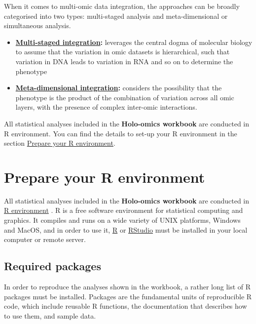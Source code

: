 \documentclass[
]{book}
\begin{document}
When it comes to multi-omic data integration, the approaches can be broadly categorised into two types: multi-staged analysis and meta-dimensional or simultaneous analysis.

\begin{itemize}
\item
  \textbf{\protect\hyperlink{multi-staged-integration}{Multi-staged integration}:} leverages the central dogma of molecular biology to assume that the variation in omic datasets is hierarchical, such that variation in DNA leads to variation in RNA and so on to determine the phenotype
\item
  \textbf{\protect\hyperlink{meta-dimensional-integration}{Meta-dimensional integration}:} considers the possibility that the phenotype is the product of the combination of variation across all omic layers, with the presence of complex inter-omic interactions.
\end{itemize}

All statistical analyses included in the \textbf{Holo-omics workbook} are conducted in R environment. You can find the details to set-up your R environment in the section \protect\hyperlink{prepare-r}{Prepare your R environment}.

\hypertarget{prepare-r}{%
\section{Prepare your R environment}\label{prepare-r}}

All statistical analyses included in the \textbf{Holo-omics workbook} are conducted in \href{https://en.wikipedia.org/wiki/R_(programming_language)}{R environment} \citep{R_Development_Core_Team2008-gd}. R is a free software environment for statistical computing and graphics. It compiles and runs on a wide variety of UNIX platforms, Windows and MacOS, and in order to use it, \href{https://cran.r-project.org/}{R} or \href{https://posit.co/downloads/}{RStudio} must be installed in your local computer or remote server.

\hypertarget{required-packages}{%
\subsection*{Required packages}\label{required-packages}}

In order to reproduce the analyses shown in the workbook, a rather long list of R packages must be installed. Packages are the fundamental units of reproducible R code, which include reusable R functions, the documentation that describes how to use them, and sample data.
\end{document}
